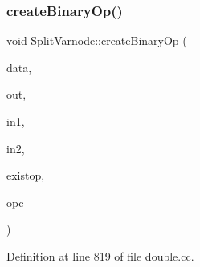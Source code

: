 \subsubsection{\texorpdfstring{createBinaryOp()}{createBinaryOp()}}
{\footnotesize\ttfamily void Split\+Varnode\+::create\+Binary\+Op (\begin{DoxyParamCaption}\item[{\mbox{\hyperlink{class_funcdata}{Funcdata}} \&}]{data,  }\item[{\mbox{\hyperlink{class_split_varnode}{Split\+Varnode}} \&}]{out,  }\item[{\mbox{\hyperlink{class_split_varnode}{Split\+Varnode}} \&}]{in1,  }\item[{\mbox{\hyperlink{class_split_varnode}{Split\+Varnode}} \&}]{in2,  }\item[{\mbox{\hyperlink{class_pcode_op}{Pcode\+Op}} $\ast$}]{existop,  }\item[{\mbox{\hyperlink{opcodes_8hh_abeb7dfb0e9e2b3114e240a405d046ea7}{Op\+Code}}}]{opc }\end{DoxyParamCaption})\hspace{0.3cm}{\ttfamily [static]}}



Definition at line 819 of file double.\+cc.

